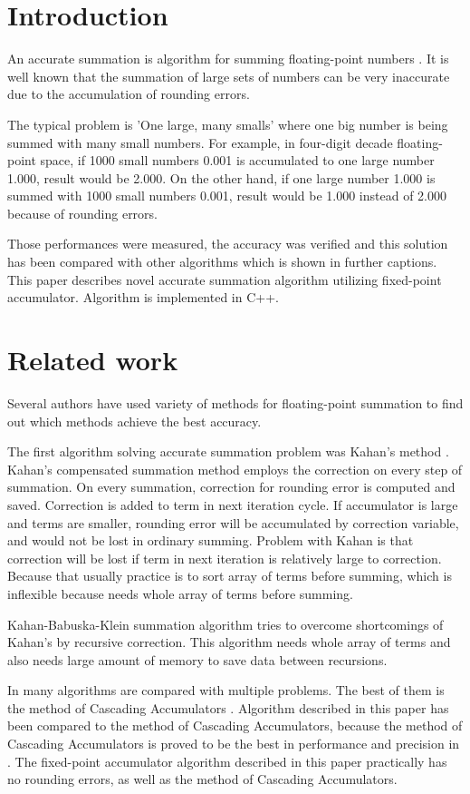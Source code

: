 \documentclass[conference]{IEEEtran}
\begin{document}
\section{Introduction}
An accurate summation \cite{Higham} is algorithm for summing 
floating-point numbers \cite{WhatShouldKnowAboutFP}. 
It is well known that the summation 
of large sets of numbers can be very inaccurate due
to the accumulation of rounding errors. 
\par
The typical problem is 'One large, many smalls' \cite{ComparisonOfMethods} 
where one big number is being summed with many small numbers. 
For example, in four-digit decade floating-point space,
if 1000 small numbers 0.001 is accumulated to one large 
number 1.000, result would be 2.000. On the other hand,
if one large number 1.000 is summed with 1000 small numbers 0.001,
result would be 1.000 instead of 2.000 because of rounding errors.
\par
Those performances were measured, the accuracy was verified and this 
solution has been compared with other algorithms which is 
shown in further captions. This paper describes novel accurate 
summation algorithm utilizing fixed-point accumulator.
Algorithm is implemented in C++.


\section{Related work}
Several authors have used variety of methods for floating-point 
summation to find out which methods achieve the best accuracy. 
\par
The first algorithm solving accurate summation problem was Kahan's method \cite{ComparisonOfMethods}. 
Kahan's compensated summation method employs the correction 
on every step of summation. 
On every summation, correction for rounding error is computed and saved.
Correction is added to term in next iteration cycle.
If accumulator is large and terms are smaller, rounding error will be accumulated by correction variable, 
and would not be lost in ordinary summing.
Problem with Kahan is that correction will be lost if term in next iteration is relatively large to correction.
Because that usually practice is to sort array of terms before summing, 
which is inflexible because needs whole array of terms before summing.
\par
Kahan-Babuska-Klein summation algorithm \cite{KahanBabuskaKlein} tries to overcome shortcomings of Kahan's by recursive correction.
This algorithm needs whole array of terms and also needs large amount of memory to save data between recursions.
\par
In \cite{ComparisonOfMethods} many algorithms are compared with multiple problems.
The best of them is the method of Cascading Accumulators \cite{CascadingAccumulators}.
Algorithm described in this paper has been compared to the method of Cascading Accumulators,
because the method of Cascading Accumulators is proved 
to be the best in performance and precision in \cite{ComparisonOfMethods}.
The fixed-point accumulator algorithm described in this paper practically has no rounding errors,
as well as the method of Cascading Accumulators.
\end{document}
